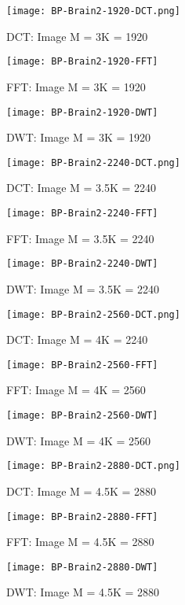 \documentclass[titlepage,oneside, 12pt]{book}
\theoremstyle{break}
\begin{document}
\begin{figure}[!h]
\centering
{}
  \texttt{[image: BP-Brain2-1920-DCT.png]}
  \caption{DCT: Image M = 3K = 1920}\label{fig:BP-Brain2-1920-DCT}
\endminipage
\hspace*{2em}
  \texttt{[image: BP-Brain2-1920-FFT]}
  \caption{FFT: Image M = 3K = 1920}\label{fig:BP-Brain2-1920-FFT}
\endminipage
\hspace*{2em}
%
  \texttt{[image: BP-Brain2-1920-DWT]}
  \caption{DWT: Image M = 3K = 1920}\label{fig:BP-Brain2-1920-DWT}
\endminipage
\hspace*{2em}
\end{figure}

\clearpage

\begin{figure}[!h]
\centering
{}
  \texttt{[image: BP-Brain2-2240-DCT.png]}
  \caption{DCT: Image M = 3.5K = 2240}\label{fig:BP-Brain2-2240-DCT}
\endminipage
\hspace*{2em}
  \texttt{[image: BP-Brain2-2240-FFT]}
  \caption{FFT: Image M = 3.5K = 2240}\label{fig:BP-Brain2-2240-FFT}
\endminipage
\hspace*{2em}
%
  \texttt{[image: BP-Brain2-2240-DWT]}
  \caption{DWT: Image M = 3.5K = 2240}\label{fig:BP-Brain2-2240-DWT}
\endminipage
\hspace*{2em}
\end{figure}

\begin{figure}[!h]
\centering
{}
  \texttt{[image: BP-Brain2-2560-DCT.png]}
  \caption{DCT: Image M = 4K = 2240}\label{fig:BP-Brain2-2560-DCT}
\endminipage
\hspace*{2em}
  \texttt{[image: BP-Brain2-2560-FFT]}
  \caption{FFT: Image M = 4K = 2560}\label{fig:BP-Brain2-2560-FFT}
\endminipage
\hspace*{2em}
%
  \texttt{[image: BP-Brain2-2560-DWT]}
  \caption{DWT: Image M = 4K = 2560}\label{fig:BP-Brain2-2560-DWT}
\endminipage
\hspace*{2em}
\end{figure}

\begin{figure}[!h]
\centering
{}
  \texttt{[image: BP-Brain2-2880-DCT.png]}
  \caption{DCT: Image M = 4.5K = 2880}\label{fig:BP-Brain2-2880-DCT}
\endminipage
\hspace*{2em}
  \texttt{[image: BP-Brain2-2880-FFT]}
  \caption{FFT: Image M = 4.5K = 2880}\label{fig:BP-Brain2-2880-FFT}
\endminipage
\hspace*{2em}
%
  \texttt{[image: BP-Brain2-2880-DWT]}
  \caption{DWT: Image M = 4.5K = 2880}\label{fig:BP-Brain2-2880-DWT}
\endminipage
\hspace*{2em}
\end{figure}
\clearpage
\end{document}

